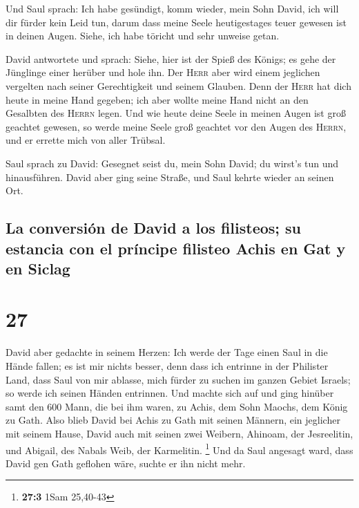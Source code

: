  Und Saul sprach: Ich habe gesündigt, komm wieder, mein
Sohn David, ich will dir fürder kein Leid tun, darum dass meine Seele
heutigestages teuer gewesen ist in deinen Augen. Siehe, ich habe töricht
und sehr unweise getan.

 David antwortete und sprach: Siehe, hier ist der Spieß
des Königs; es gehe der Jünglinge einer herüber und hole ihn.
 Der \textsc{Herr} aber wird einem jeglichen vergelten
nach seiner Gerechtigkeit und seinem Glauben. Denn der \textsc{Herr} hat
dich heute in meine Hand gegeben; ich aber wollte meine Hand nicht an
den Gesalbten des \textsc{Herrn} legen.  Und wie heute
deine Seele in meinen Augen ist groß geachtet gewesen, so werde meine
Seele groß geachtet vor den Augen des \textsc{Herrn}, und er errette
mich von aller Trübsal.

 Saul sprach zu David: Gesegnet seist du, mein Sohn
David; du wirst's tun und hinausführen. David aber ging seine Straße,
und Saul kehrte wieder an seinen Ort.

\hypertarget{la-conversiuxf3n-de-david-a-los-filisteos-su-estancia-con-el-pruxedncipe-filisteo-achis-en-gat-y-en-siclag}{%
\subsection{La conversión de David a los filisteos; su estancia con el
príncipe filisteo Achis en Gat y en
Siclag}\label{la-conversiuxf3n-de-david-a-los-filisteos-su-estancia-con-el-pruxedncipe-filisteo-achis-en-gat-y-en-siclag}}

\hypertarget{section-26}{%
\section{27}\label{section-26}}

 David aber gedachte in seinem Herzen: Ich werde der Tage
einen Saul in die Hände fallen; es ist mir nichts besser, denn dass ich
entrinne in der Philister Land, dass Saul von mir ablasse, mich fürder
zu suchen im ganzen Gebiet Israels; so werde ich seinen Händen
entrinnen.  Und machte sich auf und ging hinüber samt den
600 Mann, die bei ihm waren, zu Achis, dem Sohn Maochs, dem König zu
Gath.  Also blieb David bei Achis zu Gath mit seinen
Männern, ein jeglicher mit seinem Hause, David auch mit seinen zwei
Weibern, Ahinoam, der Jesreelitin, und Abigail, des Nabals Weib, der
Karmelitin. \footnote{\textbf{27:3} 1Sam 25,40-43}  Und da
Saul angesagt ward, dass David gen Gath geflohen wäre, suchte er ihn
nicht mehr.

